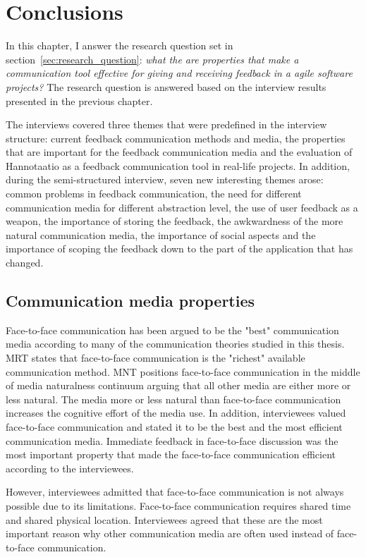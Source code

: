 \documentclass[english,12pt,a4paper,pdftex]{article}
\begin{document}
\clearpage

\section{Conclusions}
\label{sec:conclusion}
\acresetall

In this chapter, I answer the research question set in section~\ref{sec:research_question}: \textit{what the are properties that make a communication tool effective for giving and receiving feedback in a agile software projects?} The research question is answered based on the interview results presented in the previous chapter.

The interviews covered three themes that were predefined in the interview structure: current feedback communication methods and media, the properties that are important for the feedback communication media and the evaluation of Hannotaatio as a feedback communication tool in real-life projects. In addition, during the semi-structured interview, seven new interesting themes arose: common problems in feedback communication, the need for different communication media for different abstraction level, the use of user feedback as a weapon, the importance of storing the feedback, the awkwardness of the more natural communication media, the importance of social aspects and the importance of scoping the feedback down to the part of the application that has changed.

\subsection{Communication media properties}

Face-to-face communication has been argued to be the "best" communication media according to many of the communication theories studied in this thesis. \Ac{MRT} states that face-to-face communication is the "richest" available communication method. \Ac{MNT} positions face-to-face communication in the middle of media naturalness continuum arguing that all other media are either more or less natural. The media more or less natural than face-to-face communication increases the cognitive effort of the media use. In addition, interviewees valued face-to-face communication and stated it to be the best and the most efficient communication media. Immediate feedback in face-to-face discussion was the most important property that made the face-to-face communication efficient according to the interviewees.

However, interviewees admitted that face-to-face communication is not always possible due to its limitations. Face-to-face communication requires shared time and shared physical location. Interviewees agreed that these are the most important reason why other communication media are often used instead of face-to-face communication.
\end{document}
